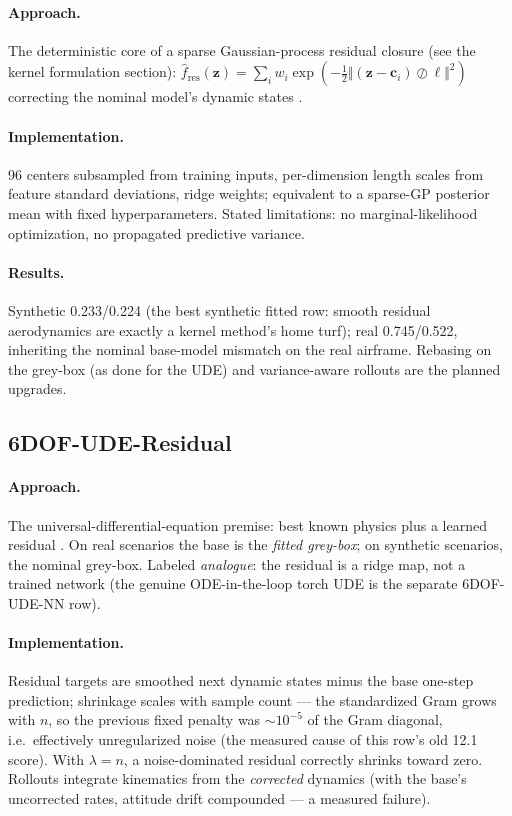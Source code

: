 \documentclass[11pt]{article}
\begin{document}
\paragraph{Approach.} The deterministic core of a sparse Gaussian-process
residual closure (see the kernel formulation section):
$\hat f_{\mathrm{res}}(\mathbf z)=\sum_i w_i\exp(-\tfrac12\Vert(\mathbf z-
\mathbf c_i)\oslash\boldsymbol\ell\Vert^2)$ correcting the nominal model's
dynamic states \cite{rasmussen2006gaussian,hemakumara2013learning}.
\paragraph{Implementation.} 96 centers subsampled from training inputs,
per-dimension length scales from feature standard deviations, ridge
weights; equivalent to a sparse-GP posterior mean with fixed
hyperparameters. Stated limitations: no marginal-likelihood optimization,
no propagated predictive variance.
\paragraph{Results.} Synthetic 0.233/0.224 (the best synthetic fitted row:
smooth residual aerodynamics are exactly a kernel method's home turf); real
0.745/0.522, inheriting the nominal base-model mismatch on the real
airframe. Rebasing on the grey-box (as done for the UDE) and
variance-aware rollouts are the planned upgrades.

\subsection{6DOF-UDE-Residual}
\paragraph{Approach.} The universal-differential-equation premise: best
known physics plus a learned residual \cite{rackauckas2020universal}. On
real scenarios the base is the \emph{fitted grey-box}; on synthetic
scenarios, the nominal grey-box. Labeled \emph{analogue}: the residual is a
ridge map, not a trained network (the genuine ODE-in-the-loop torch UDE
is the separate 6DOF-UDE-NN row).
\paragraph{Implementation.} Residual targets are smoothed next dynamic
states minus the base one-step prediction; shrinkage scales with sample
count --- the standardized Gram grows with $n$, so the previous fixed
penalty was $\sim$$10^{-5}$ of the Gram diagonal, i.e.\ effectively
unregularized noise (the measured cause of this row's old 12.1 score). With
$\lambda=n$, a noise-dominated residual correctly shrinks toward zero.
Rollouts integrate kinematics from the \emph{corrected} dynamics (with the
base's uncorrected rates, attitude drift compounded --- a measured
failure).
\end{document}
